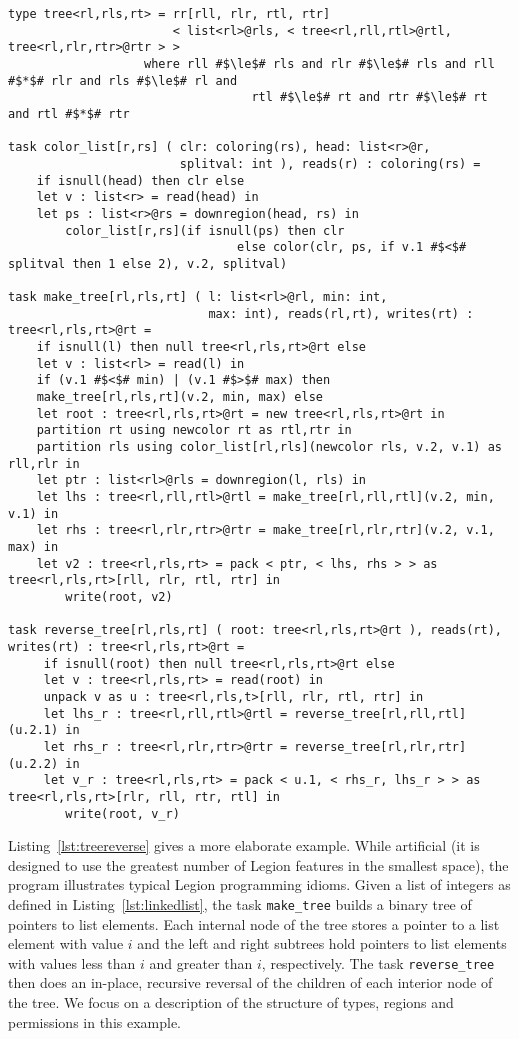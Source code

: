 \begin{lstlisting}[float={t},label={lst:treereverse},caption={Tree Partitioning and Reversal Example}]
type tree<rl,rls,rt> = rr[rll, rlr, rtl, rtr] 
                       < list<rl>@rls, < tree<rl,rll,rtl>@rtl, tree<rl,rlr,rtr>@rtr > >
     		       where rll #$\le$# rls and rlr #$\le$# rls and rll #$*$# rlr and rls #$\le$# rl and
                                  rtl #$\le$# rt and rtr #$\le$# rt and rtl #$*$# rtr 

task color_list[r,rs] ( clr: coloring(rs), head: list<r>@r, 
                        splitval: int ), reads(r) : coloring(rs) =
    if isnull(head) then clr else
    let v : list<r> = read(head) in
    let ps : list<r>@rs = downregion(head, rs) in
        color_list[r,rs](if isnull(ps) then clr 
                                else color(clr, ps, if v.1 #$<$# splitval then 1 else 2), v.2, splitval)

task make_tree[rl,rls,rt] ( l: list<rl>@rl, min: int, 
                            max: int), reads(rl,rt), writes(rt) : tree<rl,rls,rt>@rt =
    if isnull(l) then null tree<rl,rls,rt>@rt else 
    let v : list<rl> = read(l) in
    if (v.1 #$<$# min) | (v.1 #$>$# max) then
    make_tree[rl,rls,rt](v.2, min, max) else
    let root : tree<rl,rls,rt>@rt = new tree<rl,rls,rt>@rt in
    partition rt using newcolor rt as rtl,rtr in
    partition rls using color_list[rl,rls](newcolor rls, v.2, v.1) as rll,rlr in
    let ptr : list<rl>@rls = downregion(l, rls) in
    let lhs : tree<rl,rll,rtl>@rtl = make_tree[rl,rll,rtl](v.2, min, v.1) in
    let rhs : tree<rl,rlr,rtr>@rtr = make_tree[rl,rlr,rtr](v.2, v.1, max) in
    let v2 : tree<rl,rls,rt> = pack < ptr, < lhs, rhs > > as tree<rl,rls,rt>[rll, rlr, rtl, rtr] in
        write(root, v2)

task reverse_tree[rl,rls,rt] ( root: tree<rl,rls,rt>@rt ), reads(rt), writes(rt) : tree<rl,rls,rt>@rt =
     if isnull(root) then null tree<rl,rls,rt>@rt else
     let v : tree<rl,rls,rt> = read(root) in
     unpack v as u : tree<rl,rls,t>[rll, rlr, rtl, rtr] in
     let lhs_r : tree<rl,rll,rtl>@rtl = reverse_tree[rl,rll,rtl](u.2.1) in
     let rhs_r : tree<rl,rlr,rtr>@rtr = reverse_tree[rl,rlr,rtr](u.2.2) in
     let v_r : tree<rl,rls,rt> = pack < u.1, < rhs_r, lhs_r > > as tree<rl,rls,rt>[rlr, rll, rtr, rtl] in
        write(root, v_r)
\end{lstlisting}

Listing~\ref{lst:treereverse} gives a more elaborate example.  While
artificial (it is designed to use the greatest number of Legion
features in the smallest space), the program illustrates typical
Legion programming idioms.  Given a list of integers as defined in Listing~\ref{lst:linkedlist}, 
the task {\tt make\_tree} builds a binary tree of pointers to list elements.
Each internal node of the tree stores a pointer to a list element with value $i$
and the left and right subtrees hold pointers to list elements with values less than $i$ and greater than $i$,
respectively.  The task {\tt reverse\_tree} then does an in-place, recursive reversal of the children of each interior
node of the tree.  We focus on a description of the structure of types, regions and permissions in this example.

